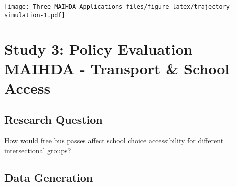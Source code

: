 \documentclass[
]{article}
\begin{document}
\texttt{[image: Three\_MAIHDA\_Applications\_files/figure-latex/trajectory-simulation-1.pdf]}

\hypertarget{study-3-policy-evaluation-maihda---transport-school-access}{%
\section{Study 3: Policy Evaluation MAIHDA - Transport \& School
Access}\label{study-3-policy-evaluation-maihda---transport-school-access}}

\hypertarget{research-question-2}{%
\subsection{Research Question}\label{research-question-2}}

How would free bus passes affect school choice accessibility for
different intersectional groups?

\hypertarget{data-generation-2}{%
\subsection{Data Generation}\label{data-generation-2}}
\end{document}
